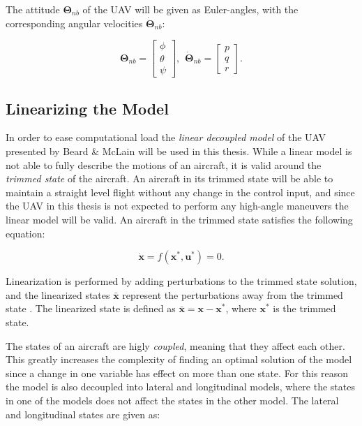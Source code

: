 The attitude $\bm{\Theta}_{nb}$ of the UAV will be given as Euler-angles, with the corresponding angular velocities $\bm{\dot{\Theta}}_{nb}$:

\begin{equation}
	\bm{\Theta}_{nb} =
	\begin{bmatrix}
		\phi \\ \theta \\ \psi
	\end{bmatrix},
	\hspace{5pt}
	\dot{\bm{\Theta}}_{nb} =
	\begin{bmatrix}
		p \\ q \\ r
	\end{bmatrix}.
\end{equation}


\subsection{Linearizing the Model}

In order to ease computational load the \textit{linear decoupled model} of the UAV presented by Beard \& McLain \cite{uavBEARD} will be used in this thesis. While a linear model is not able to fully describe the motions of an aircraft, it is valid around the \textit{trimmed state} of the aircraft. An aircraft in its trimmed state will be able to maintain a straight level flight without any change in the control input, and since the UAV in this thesis is not expected to perform any high-angle maneuvers the linear model will be valid. An aircraft in the trimmed state satisfies the following equation:

\begin{equation}
	\mathbf{\dot{x}} = f(\mathbf{x}^*, \mathbf{u}^*) = 0.
\end{equation}

Linearization is performed by adding perturbations to the trimmed state solution, and the linearized states $\mathbf{\bar{x}}$ represent the perturbations away from the trimmed state \cite{modsimEGELAND}. The linearized state is defined as $\mathbf{\bar{x}} = \mathbf{x} - \mathbf{x}^*$, where $\mathbf{x}^*$ is the trimmed state.

The states of an aircraft are higly \textit{coupled}, meaning that they affect each other. This greatly increases the complexity of finding an optimal solution of the model since a change in one variable has effect on more than one state. For this reason the model is also decoupled into lateral and longitudinal models, where the states in one of the models does not affect the states in the other model. The lateral and longitudinal states are given as:

